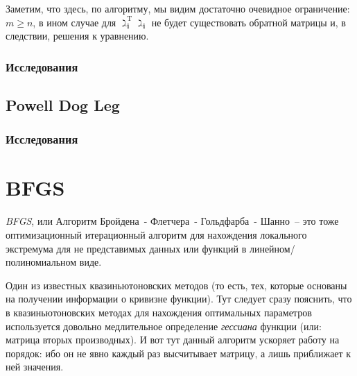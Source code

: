 \documentclass[12pt, a4paper, oneside, final]{article}
\begin{document}
	Заметим, что здесь, по алгоритму, мы видим достаточно очевидное ограничение: $m \geqslant n$, в ином случае для $\gimel_{\mathbf{i}}^{\mathrm{T}}\gimel_{\mathbf{i}}$ не будет существовать обратной матрицы и, в следствии, решения к уравнению.
	\subsubsection*{Исследования}
	\subsection*{Powell Dog Leg}
	\subsubsection*{Исследования}
	\newpage
	\section*{BFGS}
	\textit{BFGS}, или Алгоритм Бройдена~- Флетчера~- Гольдфарба~- Шанно~-- это тоже оптимизационный итерационный алгоритм для нахождения локального экстремума для не представимых данных или функций в линейном/полиномиальном виде.

	Один из известных квазиньютоновских методов (то есть, тех, которые основаны на получении информации о кривизне функции).
	Тут следует сразу пояснить, что в квазиньютоновских методах для нахождения оптимальных параметров используется довольно медлительное определение \textit{гессиана} функции (или: матрица вторых производных).
	И вот тут данный алгоритм ускоряет работу на порядок: ибо он не явно каждый раз высчитывает матрицу, а лишь приближает к ней значения.
\end{document}
